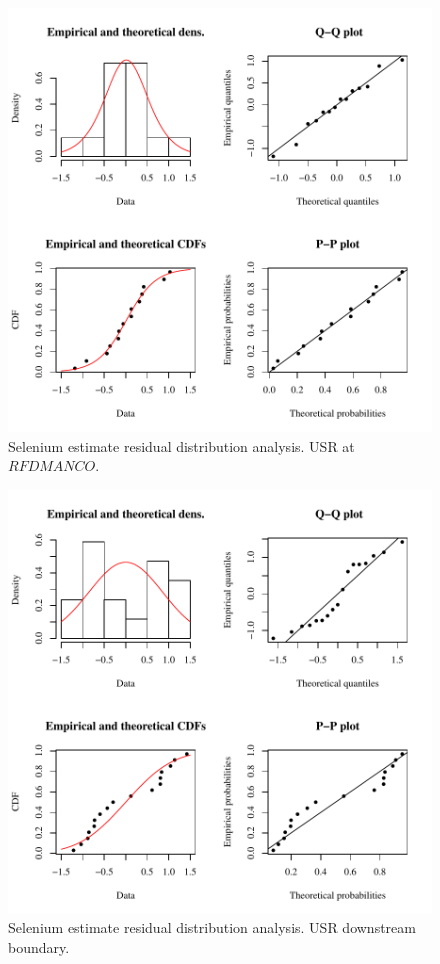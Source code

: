 \begin{figure}[htbp]
	\begin{center}
	\includegraphics[width=6in]{"Figures/Results_USR/Conc Model res-fit U167"}
	\caption{Selenium estimate residual distribution analysis.  USR at $RFDMANCO$.}
	\end{center}
\end{figure}
\newpage

\begin{figure}[htbp]
	\begin{center}
	\includegraphics[width=6in]{"Figures/Results_USR/Conc Model res-fit U201"}
	\caption{Selenium estimate residual distribution analysis.  USR downstream boundary.}
	\end{center}
\end{figure}
\newpage

